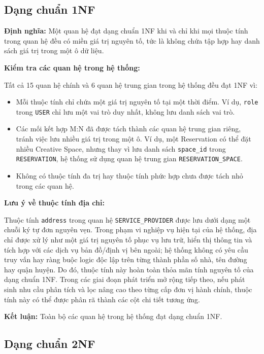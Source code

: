 \subsection{Dạng chuẩn 1NF}

\textbf{Định nghĩa:} Một quan hệ đạt dạng chuẩn 1NF khi và chỉ khi mọi thuộc tính trong quan hệ đều có miền giá trị nguyên tố, tức là không chứa tập hợp hay danh sách giá trị trong một ô dữ liệu.

\textbf{Kiểm tra các quan hệ trong hệ thống:}

Tất cả 15 quan hệ chính và 6 quan hệ trung gian trong hệ thống đều đạt 1NF vì:

\begin{itemize}
    \item Mỗi thuộc tính chỉ chứa một giá trị nguyên tố tại một thời điểm. Ví dụ, \texttt{role} trong \texttt{USER} chỉ lưu một vai trò duy nhất, không lưu danh sách vai trò.
    \item Các mối kết hợp M:N đã được tách thành các quan hệ trung gian riêng, tránh việc lưu nhiều giá trị trong một ô. Ví dụ, một Reservation có thể đặt nhiều Creative Space, nhưng thay vì lưu danh sách \texttt{space\_id} trong \texttt{RESERVATION}, hệ thống sử dụng quan hệ trung gian \texttt{RESERVATION\_SPACE}.
    \item Không có thuộc tính đa trị hay thuộc tính phức hợp chưa được tách nhỏ trong các quan hệ.
\end{itemize}

\textbf{Lưu ý về thuộc tính địa chỉ:}

Thuộc tính \texttt{address} trong quan hệ \texttt{SERVICE\_PROVIDER} được lưu dưới dạng một chuỗi ký tự đơn nguyên vẹn. Trong phạm vi nghiệp vụ hiện tại của hệ thống, địa chỉ được xử lý như một giá trị nguyên tố phục vụ lưu trữ, hiển thị thông tin và tích hợp với các dịch vụ bản đồ/định vị bên ngoài; hệ thống không có yêu cầu truy vấn hay ràng buộc logic độc lập trên từng thành phần số nhà, tên đường hay quận huyện. Do đó, thuộc tính này hoàn toàn thỏa mãn tính nguyên tố của dạng chuẩn 1NF. Trong các giai đoạn phát triển mở rộng tiếp theo, nếu phát sinh nhu cầu phân tích và lọc nâng cao theo từng cấp đơn vị hành chính, thuộc tính này có thể được phân rã thành các cột chi tiết tương ứng.

\textbf{Kết luận:} Toàn bộ các quan hệ trong hệ thống đạt dạng chuẩn 1NF.

\subsection{Dạng chuẩn 2NF}

